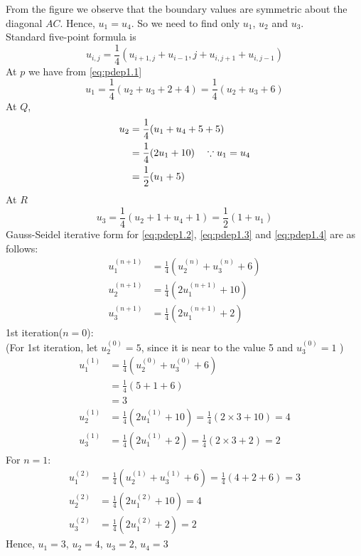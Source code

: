 \documentclass[../main-sheet.tex]{subfiles}
\begin{document}
\begin{soln}
    From the figure we observe that the boundary values are symmetric about the diagonal \(AC\). Hence, \(u_1=u_4\). So we need to find only \(u_1\), \(u_2\) and \(u_3\).\\
    Standard five-point formula is
    \begin{equation}
        u_{i,j}=\frac{1}{4}(u_{i+1,j}+u_{i-1},j+u_{i,j+1}+u_{i,j-1})
        \label{eq:pdep1.1}
    \end{equation}
    At \(p\) we have from \eqref{eq:pdep1.1}
    \begin{equation}
        u_1=\frac{1}{4}(u_2+u_3+2+4)=\frac{1}{4}(u_2+u_3+6)\label{eq:pdep1.2}
    \end{equation}
    At \(Q\),
    \begin{align}
        u_2&=\frac{1}{4}(u_1+u_4+5+5)\notag\\
        &=\frac{1}{4}(2u_1+10)\quad \because u_1=u_4\notag\\
        &=\frac{1}{2}(u_1+5)\label{eq:pdep1.3}
    \end{align}
    At \(R\)
    \begin{equation}
        u_3=\frac{1}{4}(u_2+1+u_4+1)=\frac{1}{2}(1+u_1)\label{eq:pdep1.4}
    \end{equation}
    Gauss-Seidel iterative form for \eqref{eq:pdep1.2}, \eqref{eq:pdep1.3} and \eqref{eq:pdep1.4} are as follows:
    \begin{align*}
        u_1^{(n+1)}&=\frac{1}{4}(u_2^{(n)}+u_3^{(n)}+6)\\
        u_2^{(n+1)}&=\frac{1}{4}(2u_1^{(n+1)}+10)\\
        u_3^{(n+1)}&=\frac{1}{4}(2u_1^{(n+1)}+2)
    \end{align*}
    1st iteration(\(n=0\)):\\
    (For 1st iteration, let \(u_2^{(0)}=5\), since it is near to the value 5 and \(u_3^{(0)}=1\) )
    \begin{align*}
        u_1^{(1)}&=\frac{1}{4}(u_2^{(0)}+u_3^{(0)}+6)\\
        &=\frac{1}{4}(5+1+6)\\
        &=3\\
        u_2^{(1)}&=\frac{1}{4}(2u_1^{(1)}+10)=\frac{1}{4}(2\times 3+10)=4\\
        u_3^{(1)}&=\frac{1}{4}(2u_1^{(1)}+2)=\frac{1}{4}(2\times 3+2)=2
    \end{align*}
    For \(n=1\):
    \begin{align*}
        u_1^{(2)}&=\frac{1}{4}(u_2^{(1)}+u_3^{(1)}+6)=\frac{1}{4}(4+2+6)=3\\
        u_2^{(2)}&=\frac{1}{4}(2u_1^{(2)}+10)=4\\
        u_3^{(2)}&=\frac{1}{4}(2u_1^{(2)}+2)=2
    \end{align*}
    Hence, \(u_1=3\), \(u_2=4\), \(u_3=2\), \(u_4=3\)
\end{soln}
\end{document}
